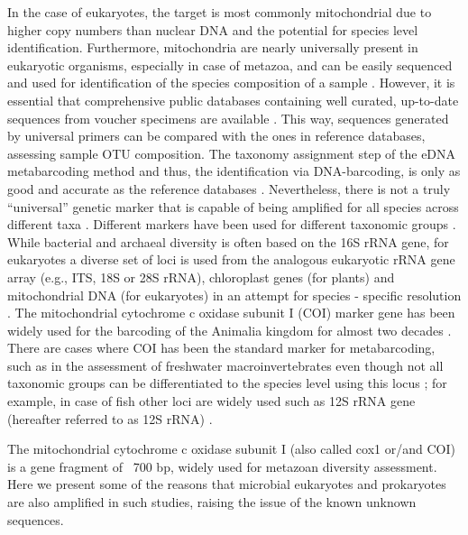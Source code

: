 

   In the case of eukaryotes, the target is most commonly mitochondrial due to higher copy numbers than nuclear DNA and the potential for species level identification. 
   Furthermore, mitochondria are nearly universally present in eukaryotic organisms, especially in case of metazoa, and can be easily sequenced and used for identification of the species composition of a sample \citep{taberlet2012towards}. 
   However, it is essential that comprehensive public databases containing well curated, up-to-date sequences from voucher specimens are available \citep{schenekar2020reference}. 
   This way, sequences generated by universal primers can be compared with the ones in reference databases, assessing sample OTU composition. 
   The taxonomy assignment step of the eDNA metabarcoding method and thus, the identification via DNA-barcoding, is only as good and accurate as the reference databases \citep{cilleros2019unlocking}. 
   Nevertheless, there is not a truly “universal” genetic marker that is capable of being amplified for all species across different taxa \citep{kress2015dna}. 
   Different markers have been used for different taxonomic groups \citep{deiner2017environmental}. 
   While bacterial and archaeal diversity is often based on the 16S rRNA gene, for eukaryotes a diverse set of loci is used from the analogous eukaryotic rRNA gene array (e.g., ITS, 18S or 28S rRNA), chloroplast genes (for plants) and mitochondrial DNA (for eukaryotes) in an attempt for species - specific resolution \citep{coissac2012bioinformatic}. 
   The mitochondrial cytochrome c oxidase subunit I (COI) marker gene has been widely used for the barcoding of the Animalia kingdom for almost two decades \citep{hebert2003barcoding}.
   There are cases where COI has been the standard marker for metabarcoding, such as in the assessment of freshwater macroinvertebrates \citep{elbrecht2017validation} even though not all taxonomic groups can be differentiated to the species level using this locus \citep{deiner2017environmental}; 
   for example, in case of fish other loci are widely used such as 12S rRNA gene (hereafter referred to as 12S rRNA) \citep{miya2020mifish}.


   The mitochondrial cytochrome c oxidase subunit I (also called cox1 or/and COI) is a gene fragment of ~700 bp, widely used for metazoan diversity assessment. Here we present some of the reasons that microbial eukaryotes and prokaryotes are also amplified in such studies, raising the issue of the known unknown sequences.

